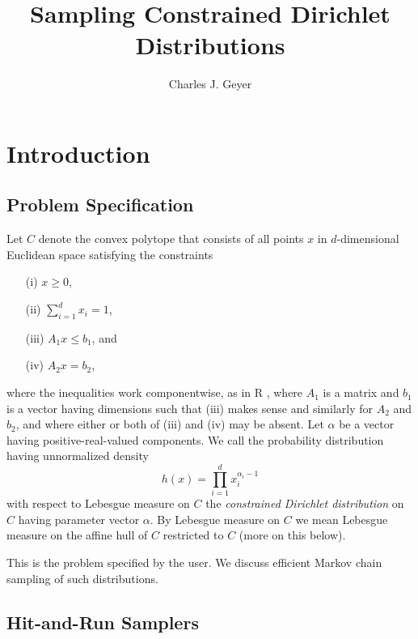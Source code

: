 \documentclass[11pt]{article}
\begin{document}
\title{Sampling Constrained Dirichlet Distributions}

\author{Charles J. Geyer}

\maketitle

\section{Introduction}

\subsection{Problem Specification} \label{sec:specification}

Let $C$ denote the convex polytope that consists of all points $x$ in
$d$-dimensional Euclidean space satisfying the constraints
\begin{enumerate}
\item[(i)] $x \ge 0$,
\item[(ii)] $\sum_{i = 1}^d x_i = 1$,
\item[(iii)] $A_1 x \le b_1$, and
\item[(iv)] $A_2 x = b_2$,
\end{enumerate}
where the inequalities work componentwise, as in R \citep{r},
where $A_1$ is a matrix
and $b_1$ is a vector having dimensions such that (iii) makes sense and
similarly for $A_2$ and $b_2$, and where either or both of (iii) and (iv)
may be absent.  Let $\alpha$ be a vector having positive-real-valued
components.  We call the probability distribution having unnormalized density
\begin{equation} \label{eq:unnormalized-density}
   h(x) = \prod_{i = 1}^d x_i^{\alpha_i - 1}
\end{equation}
with respect to Lebesgue measure on $C$ the \emph{constrained Dirichlet
distribution} on $C$ having parameter vector $\alpha$.
By Lebesgue measure on $C$ we mean Lebesgue measure on the affine hull
of $C$ restricted to $C$ (more on this below).

This is the problem specified by the user.
We discuss efficient Markov chain sampling of such distributions.

\subsection{Hit-and-Run Samplers}
\end{document}
